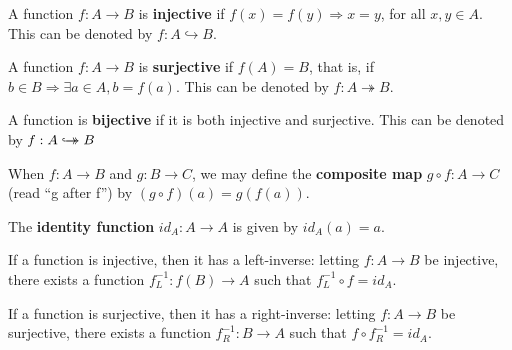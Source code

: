 \begin{definition}
  A function $f: A \to B$ is \textbf{injective} if $f(x) = f(y) \Rightarrow x = y$, for all $x, y \in A$.
  This can be denoted by $f: A \hookrightarrow B$.
\end{definition}

\begin{definition}
  A function $f: A \to B$ is \textbf{surjective} if $f(A) = B$, that is, if $b \in B \Rightarrow \exists a \in A, b = f(a)$.
  This can be denoted by $f: A \twoheadrightarrow B$.
\end{definition}

\begin{definition}
  A function is \textbf{bijective} if it is both injective and surjective.
  This can be denoted by $f: A \hookrightarrow\mathrel{\mspace{-15mu}}\rightarrow B$
\end{definition}

\begin{definition}
  When $f: A \to B$ and $g: B \to C$, we may define the \textbf{composite map} $g \circ f: A \to C$ (read ``g after f'')
  by $(g \circ f)(a) = g(f(a))$.
\end{definition}

\begin{definition}
  The \textbf{identity function} $id_{A}: A \to A$ is given by $id_{A}(a) = a$.
\end{definition}

\begin{thm}
  If a function is injective, then it has a left-inverse: letting $f: A \to B$ be injective, there exists a function $f^{-1}_{L}: f(B) \to A$
  such that $f^{-1}_{L} \circ f = id_{A}$.
\end{thm}

\begin{thm}
  If a function is surjective, then it has a right-inverse: letting $f: A \to B$ be surjective, there exists a function $f^{-1}_{R}: B \to A$
  such that $f \circ f^{-1}_{R} = id_{A}$.
\end{thm}

